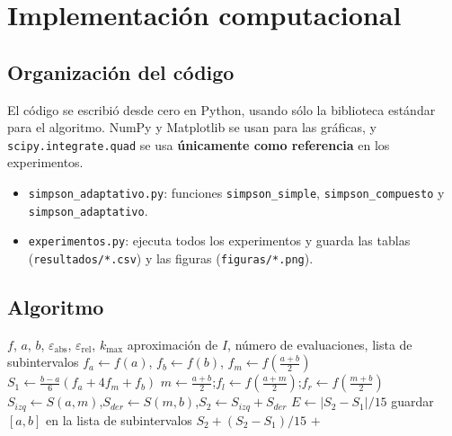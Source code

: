 \documentclass[11pt,letterpaper]{report}
\begin{document}
\chapter{Implementación computacional}

\section{Organización del código}
El código se escribió desde cero en Python, usando sólo la biblioteca estándar para el
algoritmo. NumPy y Matplotlib se usan para las gráficas, y \texttt{scipy.integrate.quad}
se usa \textbf{únicamente como referencia} en los experimentos.
\begin{itemize}
  \item \texttt{simpson\_adaptativo.py}: funciones \texttt{simpson\_simple},
        \texttt{simpson\_compuesto} y \texttt{simpson\_adaptativo}.
  \item \texttt{experimentos.py}: ejecuta todos los experimentos y guarda las tablas
        (\texttt{resultados/*.csv}) y las figuras (\texttt{figuras/*.png}).
\end{itemize}

\section{Algoritmo}
\begin{algorithm}[H]
\caption{Simpson adaptativo}
\begin{algorithmic}[1]
\Require $f$, $a$, $b$, $\varepsilon_{\text{abs}}$, $\varepsilon_{\text{rel}}$, $k_{\max}$
\Ensure aproximación de $I$, número de evaluaciones, lista de subintervalos
\State $f_a\gets f(a)$, $f_b\gets f(b)$, $f_m\gets f(\frac{a+b}{2})$ 
\State $S_1\gets \frac{b-a}{6}(f_a+4f_m+f_b)$
\State \Return {}
\Statex
{}
  \State $m\gets\frac{a+b}{2}$;\quad $f_{l}\gets f(\frac{a+m}{2})$;\quad $f_{r}\gets f(\frac{m+b}{2})$ 
  \State $S_{izq}\gets S(a,m)$,\quad $S_{der}\gets S(m,b)$,\quad $S_2\gets S_{izq}+S_{der}$
  \State $E\gets |S_2-S_1|/15$
     \State guardar $[a,b]$ en la lista de subintervalos
     \State \Return $S_2+(S_2-S_1)/15$
  \EndIf
  \State \Return {} $+$ 
\EndFunction
\end{algorithmic}
\end{algorithm}
\end{document}
